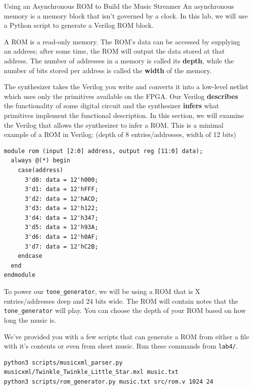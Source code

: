 \documentclass[11pt]{article}
\makeatletter
\renewcommand{\section}
{\@startsection {section}{1}{0pt}
 {-2ex}
 {1ex}
 {\bfseries\Large}}
\makeatother
\begin{document}
\section{Using an Asynchronous ROM to Build the Music Streamer}
An asynchronous memory is a memory block that isn't governed by a clock.
In this lab, we will use a Python script to generate a Verilog ROM block.

A ROM is a read-only memory.
The ROM's data can be accessed by supplying an address; after some time, the ROM will output the data stored at that address.
The number of addresses in a memory is called its \textbf{depth}, while the number of bits stored per address is called the \textbf{width} of the memory.

The synthesizer takes the Verilog you write and converts it into a low-level netlist which uses only the primitives available on the FPGA.
Our Verilog \textbf{describes} the functionality of some digital circuit and the synthesizer \textbf{infers} what primitives implement the functional description.
In this section, we will examine the Verilog that allows the synthesizer to infer a ROM.
This is a minimal example of a ROM in Verilog: (depth of 8 entries/addresses, width of 12 bits)

\begin{verbatim}
module rom (input [2:0] address, output reg [11:0] data);
  always @(*) begin
    case(address)
      3'd0: data = 12'h000;
      3'd1: data = 12'hFFF;
      3'd2: data = 12'hACD;
      3'd3: data = 12'h122;
      3'd4: data = 12'h347;
      3'd5: data = 12'h93A;
      3'd6: data = 12'h0AF;
      3'd7: data = 12'hC2B;
    endcase
  end
endmodule
\end{verbatim}

To power our \verb|tone_generator|, we will be using a ROM that is X entries/addresses deep and 24 bits wide.
The ROM will contain notes that the \verb|tone_generator| will play.
You can choose the depth of your ROM based on how long the music is.

We've provided you with a few scripts that can generate a ROM from either a file with it's contents or even from sheet music.
Run these commands from \verb|lab4/|.

\begin{verbatim}
python3 scripts/musicxml_parser.py musicxml/Twinkle_Twinkle_Little_Star.mxl music.txt
python3 scripts/rom_generator.py music.txt src/rom.v 1024 24
\end{verbatim}
\end{document}
